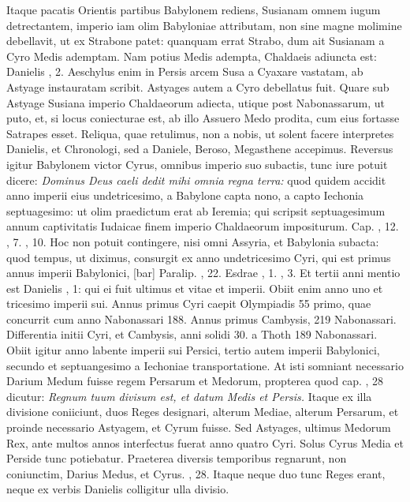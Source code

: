 Itaque pacatis Orientis partibus Babylonem rediens,
 Susianam omnem iugum
detrectantem, imperio iam olim Babyloniae attributam, non
sine magne molimine debellavit, ut ex Strabone patet: quanquam
errat Strabo, dum ait Susianam a Cyro Medis ademptam.
Nam
potius Medis adempta, Chaldaeis adiuncta est: Danielis , 2.
Aeschylus enim in Persis arcem Susa a Cyaxare vastatam, ab Astyage
instauratam scribit.
Astyages autem a Cyro debellatus fuit.
Quare sub Astyage Susiana imperio Chaldaeorum adiecta, utique
post Nabonassarum, ut puto, et, si locus coniecturae est, ab illo
Assuero Medo prodita, cum eius fortasse Satrapes esset.
Reliqua,
quae retulimus, non a nobis, ut solent facere interpretes Danielis,
et Chronologi, sed a Daniele, Beroso, Megasthene accepimus.
Reversus igitur Babylonem victor Cyrus, omnibus imperio suo
subactis, tunc iure potuit dicere: \textit{Dominus Deus caeli dedit mihi omnia
regna terra:} quod quidem accidit anno imperii eius undetricesimo,
a Babylone capta nono, a capto Iechonia septuagesimo: ut
olim praedictum erat ab Ieremia; qui scripsit septuagesimum annum
captivitatis Iudaicae finem imperio Chaldaeorum impositurum.
Cap. , 12. , 7. , 10.
Hoc non potuit contingere,
nisi omni Assyria, et Babylonia subacta: quod tempus,
ut diximus, consurgit ex anno undetricesimo Cyri, qui est primus
annus imperii Babylonici, [bar] Paralip. , 22.
Esdrae , 1.
, 3.
Et tertii anni mentio est Danielis , 1: qui ei fuit
 ultimus et
vitae et imperii.
Obiit enim anno uno et tricesimo imperii sui.
Annus primus Cyri caepit Olympiadis 55 primo, quae concurrit cum
anno Nabonassari 188.
Annus primus Cambysis, 219 Nabonassari.
Differentia initii Cyri, et Cambysis, anni solidi 30. a Thoth
189 Nabonassari.
Obiit igitur anno  labente imperii sui Persici,
tertio autem imperii Babylonici, secundo et septuangesimo a
Iechoniae transportatione.
At isti somniant necessario Darium Medum
fuisse regem Persarum et Medorum, propterea quod cap. ,
28 dicutur: \textit{Regnum tuum divisum est, et datum Medis et Persis.}
Itaque ex illa divisione coniiciunt, duos Reges designari, alterum
Mediae, alterum Persarum, et proinde necessario Astyagem, et
Cyrum fuisse.
Sed Astyages, ultimus Medorum Rex, ante multos
annos interfectus fuerat anno quatro Cyri.
Solus Cyrus Media et
Perside tunc potiebatur.
Praeterea diversis temporibus regnarunt,
non coniunctim, Darius Medus, et Cyrus. , 28.
Itaque neque
duo tunc Reges erant, neque ex verbis Danielis colligitur ulla divisio.

